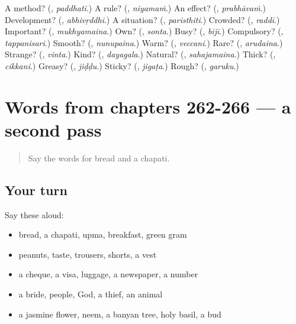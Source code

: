 \begin{tcolorbox}[breakable,colback=teal!4,colframe=teal!35!black,title={Before you move on}]
A method? (\textbf{}, \emph{paddhati}.) A rule? (\textbf{}, \emph{niyamaṁ}.) An effect? (\textbf{}, \emph{prabhāvaṁ}.) Development? (\textbf{}, \emph{abhivṛddhi}.) A situation? (\textbf{}, \emph{paristhiti}.) Crowded? (\textbf{}, \emph{raddī}.) Important? (\textbf{}, \emph{mukhyamaina}.) Own? (\textbf{}, \emph{sonta}.) Busy? (\textbf{}, \emph{bijī}.) Compulsory? (\textbf{}, \emph{tappanisari}.) Smooth? (\textbf{}, \emph{nunupaina}.) Warm? (\textbf{}, \emph{veccani}.) Rare? (\textbf{}, \emph{arudaina}.) Strange? (\textbf{}, \emph{vinta}.) Kind? (\textbf{}, \emph{dayagala}.) Natural? (\textbf{}, \emph{sahajamaina}.) Thick? (\textbf{}, \emph{cikkani}.) Greasy? (\textbf{}, \emph{jiḍḍu}.) Sticky? (\textbf{}, \emph{jigaṭa}.) Rough? (\textbf{}, \emph{garuku}.)
\end{tcolorbox}
\section[(dialogue)]{Words from chapters 262-266 — a second pass}

\label{lesson:TE-R266-second-pass-words-from-chapters-262-266}



\begin{quote}
Say the words for bread and a chapati.
\end{quote}

\subsection*{Your turn}
Say these aloud:

\begin{itemize}
\raggedright
  \item bread, a chapati, upma, breakfast, green gram
  \item peanuts, taste, trousers, shorts, a vest
  \item a cheque, a visa, luggage, a newspaper, a number
  \item a bride, people, God, a thief, an animal
  \item a jasmine flower, neem, a banyan tree, holy basil, a bud
\end{itemize}

